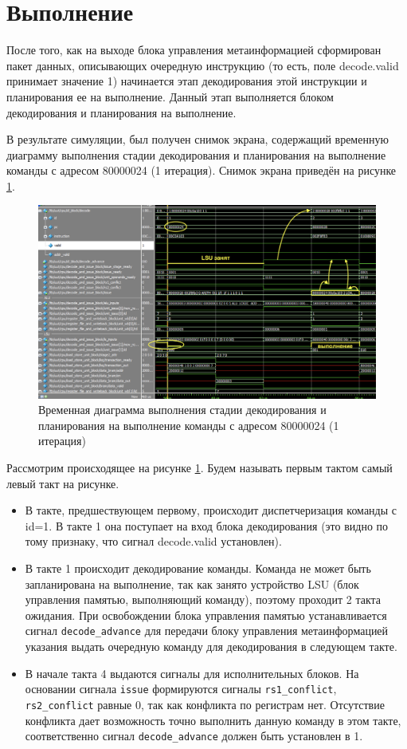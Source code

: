 \documentclass[12pt]{report}
\begin{document}
\section{Выполнение}
После того, как на выходе блока управления метаинформацией сформирован пакет данных, описывающих очередную инструкцию (то есть, поле decode.valid принимает значение 1) начинается этап
декодирования этой инструкции и планирования ее на выполнение. Данный этап выполняется блоком декодирования и планирования на выполнение.

В результате симуляции, был получен снимок экрана, содержащий временную диаграмму выполнения стадии декодирования и планирования на выполнение команды с адресом 80000024 (1 итерация). Снимок экрана приведён на рисунке \ref{decode80000024}.

\begin{figure}[h!p]
	\centering
	\includegraphics[width = \linewidth]{decode80000024.png}
	\caption{Временная диаграмма выполнения стадии декодирования и планирования на выполнение команды с адресом 80000024 (1 итерация)}
	\label{decode80000024}
\end{figure}

Рассмотрим происходящее на рисунке \ref{decode80000024}. Будем называть первым тактом самый левый такт на рисунке.
\begin{itemize}
    \item В такте, предшествующем первому, происходит диспетчеризация команды с id=1. В такте 1 она поступает на вход блока декодирования (это видно по тому признаку, что сигнал decode.valid установлен).
    \item В такте 1 происходит декодирование команды. Команда не может быть запланирована на выполнение, так как занято устройство LSU (блок управления памятью, выполняющий команду), поэтому проходит 2 такта ожидания. При освобождении блока управления памятью устанавливается сигнал \verb|decode_advance| для передачи блоку управления метаинформацией указания выдать очередную команду для декодирования в следующем такте.
    \item В начале такта 4 выдаются сигналы для исполнительных блоков. На основании сигнала \verb|issue| формируются сигналы \verb|rs1_conflict|, \verb|rs2_conflict| равные 0, так как конфликта по регистрам нет. Отсутствие конфликта дает возможность точно выполнить данную команду в этом такте, соответственно сигнал \verb|decode_advance| должен быть установлен в 1.
\end{itemize}
\end{document}
